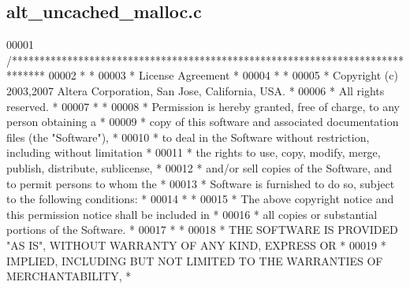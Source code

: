 \subsection{alt\+\_\+uncached\+\_\+malloc.\+c}
\label{alt__uncached__malloc_8c_source}

\begin{DoxyCode}
00001 \textcolor{comment}{/******************************************************************************}
00002 \textcolor{comment}{*                                                                             *}
00003 \textcolor{comment}{* License Agreement                                                           *}
00004 \textcolor{comment}{*                                                                             *}
00005 \textcolor{comment}{* Copyright (c) 2003,2007 Altera Corporation, San Jose, California, USA.      *}
00006 \textcolor{comment}{* All rights reserved.                                                        *}
00007 \textcolor{comment}{*                                                                             *}
00008 \textcolor{comment}{* Permission is hereby granted, free of charge, to any person obtaining a     *}
00009 \textcolor{comment}{* copy of this software and associated documentation files (the "Software"),  *}
00010 \textcolor{comment}{* to deal in the Software without restriction, including without limitation   *}
00011 \textcolor{comment}{* the rights to use, copy, modify, merge, publish, distribute, sublicense,    *}
00012 \textcolor{comment}{* and/or sell copies of the Software, and to permit persons to whom the       *}
00013 \textcolor{comment}{* Software is furnished to do so, subject to the following conditions:        *}
00014 \textcolor{comment}{*                                                                             *}
00015 \textcolor{comment}{* The above copyright notice and this permission notice shall be included in  *}
00016 \textcolor{comment}{* all copies or substantial portions of the Software.                         *}
00017 \textcolor{comment}{*                                                                             *}
00018 \textcolor{comment}{* THE SOFTWARE IS PROVIDED "AS IS", WITHOUT WARRANTY OF ANY KIND, EXPRESS OR  *}
00019 \textcolor{comment}{* IMPLIED, INCLUDING BUT NOT LIMITED TO THE WARRANTIES OF MERCHANTABILITY,    *}

\end{DoxyCode}
